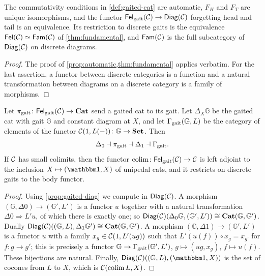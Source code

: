 \begin{proposition}\label{prop:gaited-diag}
The commutativity conditions in \cref{def:gaited-cat} are automatic, $F_H$ and
$F_T$ are unique isomorphisms, and the functor
$\mathsf{Fel}_{\mathrm{gait}}(\mathcal{C})\to\mathsf{Diag}(\mathcal{C})$ forgetting head and tail is an
equivalence. Its restriction to discrete gaits is the equivalence
$\mathsf{Fel}(\mathcal{C})\simeq\mathsf{Fam}(\mathcal{C})$ of \cref{thm:fundamental}, and $\mathsf{Fam}(\mathcal{C})$ is the full
subcategory of $\mathsf{Diag}(\mathcal{C})$ on discrete diagrams.
\end{proposition}

\begin{proof}
The proof of \cref{prop:automatic,thm:fundamental} applies verbatim. For the
last assertion, a functor between discrete categories is a function and a
natural transformation between diagrams on a discrete category is a family of
morphisms.
\end{proof}

\begin{proposition}\label{prop:gait-string}
Let $\pi_{\mathrm{gait}}\colon\mathsf{Fel}_{\mathrm{gait}}(\mathcal{C})\to\mathbf{Cat}$ send a gaited cat
to its gait. Let $\Delta_X\mathbb G$ be the gaited cat with gait $\mathbb G$ and
constant diagram at $X$, and let $\Gamma_{\mathrm{gait}}(\mathbb G,L)$ be the
category of elements of the functor $\mathcal{C}(1,L(-))\colon\mathbb G\to\mathbf{Set}$. Then
\[
\Delta_0\dashv\pi_{\mathrm{gait}}\dashv\Delta_1\dashv\Gamma_{\mathrm{gait}}.
\]
If $\mathcal{C}$ has small colimits, then the functor
$\operatorname*{colim}\colon\mathsf{Fel}_{\mathrm{gait}}(\mathcal{C})\to\mathcal{C}$ is left adjoint to the inclusion
$X\mapsto(\one,X)$ of unipedal cats, and it restricts on discrete gaits to the
body functor.
\end{proposition}

\begin{proof}
Using \cref{prop:gaited-diag} we compute in $\mathsf{Diag}(\mathcal{C})$. A morphism
$(\mathbb G,\Delta0)\to(\mathbb G',L')$ is a functor $u$ together with a natural
transformation $\Delta0\Rightarrow L'u$, of which there is exactly one; so
$\mathsf{Diag}(\mathcal{C})(\Delta_0\mathbb G,(\mathbb G',L'))\cong\mathbf{Cat}(\mathbb G,\mathbb G')$.
Dually $\mathsf{Diag}(\mathcal{C})((\mathbb G,L),\Delta_1\mathbb G')\cong\mathbf{Cat}(\mathbb G,\mathbb G')$.
A morphism $(\mathbb G,\Delta1)\to(\mathbb G',L')$ is a functor $u$ with a family
$x_g\in\mathcal{C}(1,L'(ug))$ such that $L'(u(f))\circ x_g=x_{g'}$ for $f\colon g\to g'$;
this is precisely a functor $\mathbb G\to\Gamma_{\mathrm{gait}}(\mathbb G',L')$,
$g\mapsto(ug,x_g)$, $f\mapsto u(f)$. These bijections are natural. Finally,
$\Diag(\cC)((\mathbb G,L),(\one,X))$ is the set of cocones from $L$ to $X$, which
is $\mathcal{C}(\operatorname*{colim} L,X)$.
\end{proof}

